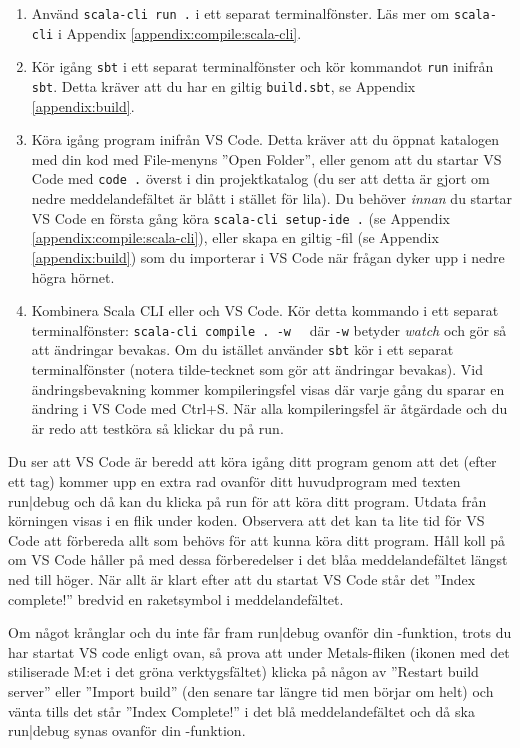 \begin{enumerate}
  \item Använd \texttt{scala-cli run .} i ett separat terminalfönster. Läs mer om \texttt{scala-cli} i Appendix \ref{appendix:compile:scala-cli}.
  \item Kör igång \texttt{sbt} i ett separat terminalfönster och kör kommandot \texttt{run} inifrån \texttt{sbt}. Detta kräver att du har en giltig \texttt{build.sbt}, se Appendix \ref{appendix:build}.
  \item Köra igång program inifrån VS Code. Detta kräver att du öppnat katalogen med din kod med File-menyns ''Open Folder'', eller genom att du startar VS Code med \texttt{code .} överst i din projektkatalog (du ser att detta är gjort om nedre meddelandefältet är blått i stället för lila). Du behöver \textit{innan} du startar VS Code en första gång köra \texttt{scala-cli setup-ide .} (se Appendix \ref{appendix:compile:scala-cli}), eller skapa en giltig -fil (se Appendix \ref{appendix:build}) som du importerar i VS Code när frågan dyker upp i nedre högra hörnet.
  \item Kombinera Scala CLI eller  och VS Code. Kör detta kommando i ett separat terminalfönster: \texttt{scala-cli compile . -w}~~ där \texttt{-w} betyder \emph{watch} och gör så att ändringar bevakas. Om du istället använder \texttt{sbt} kör  i ett separat terminalfönster (notera tilde-tecknet som gör att ändringar bevakas). Vid ändringsbevakning kommer kompileringsfel visas där varje gång du sparar en ändring i VS Code med Ctrl+S. När alla kompileringsfel är åtgärdade och du är redo att testköra så klickar du på \textsf{run}.
\end{enumerate}

Du ser att VS Code är beredd att köra igång ditt program genom att det (efter ett tag) kommer upp en extra rad ovanför ditt huvudprogram med texten \textsf{run|debug} och då kan du klicka på \textsf{run} för att köra ditt program. Utdata från körningen visas i en flik under koden. Observera att det kan ta lite tid för VS Code att förbereda allt som behövs för att kunna köra ditt program. Håll koll på om VS Code håller på med dessa förberedelser i det blåa meddelandefältet längst ned till höger. När allt är klart efter att du startat VS Code står det ''Index complete!'' bredvid en raketsymbol i meddelandefältet.

Om något krånglar och du inte får fram \textsf{run|debug} ovanför din -funktion, trots du har startat VS code enligt ovan, så prova att under Metals-fliken (ikonen med det stiliserade M:et i det gröna verktygsfältet) klicka på någon av ''Restart build server'' eller ''Import build'' (den senare tar längre tid men börjar om helt) och vänta tills det står ''Index Complete!'' i det blå meddelandefältet och då ska \textsf{run|debug} synas ovanför din -funktion.

